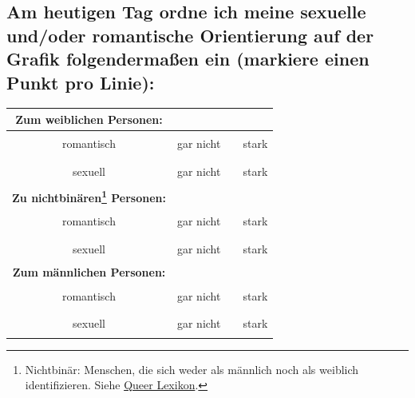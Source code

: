 \documentclass[a4paper,12pt]{article}
\begin{document}
\subsection*{Am heutigen Tag ordne ich meine sexuelle und/oder romantische Orientierung auf der Grafik folgendermaßen ein (markiere einen Punkt pro Linie):}

\begin{tabular}{|c|c|c|c|}
    \hline
    \textbf{Zum weiblichen Personen:} & & & \\  
    \hline
    romantisch & gar nicht & \rule{5cm}{0.2pt} & stark \\
    sexuell & gar nicht & \rule{5cm}{0.2pt} & stark \\
    \hline
    \textbf{Zu nichtbinären\footnote{Nichtbinär: Menschen, die sich weder als männlich noch als weiblich identifizieren. Siehe \href{https://queer-lexikon.net/uebersichtsseiten/trans/}{Queer Lexikon}.} Personen:} & & & \\  
    \hline
    romantisch & gar nicht & \rule{5cm}{0.2pt} & stark \\
    sexuell & gar nicht & \rule{5cm}{0.2pt} & stark \\
    \hline
    \textbf{Zum männlichen Personen:} & & & \\  
    \hline
    romantisch & gar nicht & \rule{5cm}{0.2pt} & stark \\
    sexuell & gar nicht & \rule{5cm}{0.2pt} & stark \\
    \hline
\end{tabular}
\end{document}
